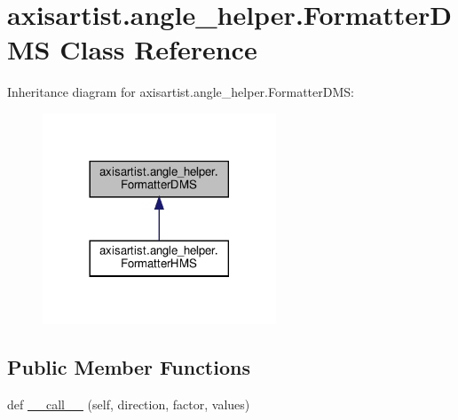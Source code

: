 \hypertarget{classaxisartist_1_1angle__helper_1_1FormatterDMS}{}\section{axisartist.\+angle\+\_\+helper.\+Formatter\+D\+MS Class Reference}
\label{classaxisartist_1_1angle__helper_1_1FormatterDMS}


Inheritance diagram for axisartist.\+angle\+\_\+helper.\+Formatter\+D\+MS\+:
\nopagebreak
\begin{figure}[H]
\begin{center}
\leavevmode
\includegraphics[width=197pt]{classaxisartist_1_1angle__helper_1_1FormatterDMS__inherit__graph}
\end{center}
\end{figure}
\subsection*{Public Member Functions}
\begin{DoxyCompactItemize}
\item 
def \hyperlink{classaxisartist_1_1angle__helper_1_1FormatterDMS_a077bdf24d991760ff921c26fdefe2cb1}{\+\_\+\+\_\+call\+\_\+\+\_\+} (self, direction, factor, values)
\end{DoxyCompactItemize}
